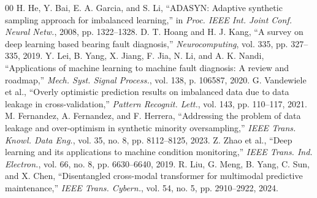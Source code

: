\documentclass[conference]{IEEEtran}
\begin{document}
\begin{thebibliography}{00}
 H. He, Y. Bai, E. A. Garcia, and S. Li, ``ADASYN: Adaptive synthetic sampling approach for imbalanced learning,'' in \textit{Proc. IEEE Int. Joint Conf. Neural Netw.}, 2008, pp. 1322--1328.
 D. T. Hoang and H. J. Kang, ``A survey on deep learning based bearing fault diagnosis,'' \textit{Neurocomputing}, vol. 335, pp. 327--335, 2019.
 Y. Lei, B. Yang, X. Jiang, F. Jia, N. Li, and A. K. Nandi, ``Applications of machine learning to machine fault diagnosis: A review and roadmap,'' \textit{Mech. Syst. Signal Process.}, vol. 138, p. 106587, 2020.
 G. Vandewiele et al., ``Overly optimistic prediction results on imbalanced data due to data leakage in cross-validation,'' \textit{Pattern Recognit. Lett.}, vol. 143, pp. 110--117, 2021.
 M. Fernandez, A. Fernandez, and F. Herrera, ``Addressing the problem of data leakage and over-optimism in synthetic minority oversampling,'' \textit{IEEE Trans. Knowl. Data Eng.}, vol. 35, no. 8, pp. 8112--8125, 2023.
 Z. Zhao et al., ``Deep learning and its applications to machine condition monitoring,'' \textit{IEEE Trans. Ind. Electron.}, vol. 66, no. 8, pp. 6630--6640, 2019.
 R. Liu, G. Meng, B. Yang, C. Sun, and X. Chen, ``Disentangled cross-modal transformer for multimodal predictive maintenance,'' \textit{IEEE Trans. Cybern.}, vol. 54, no. 5, pp. 2910--2922, 2024.
\end{thebibliography}
\end{document}
